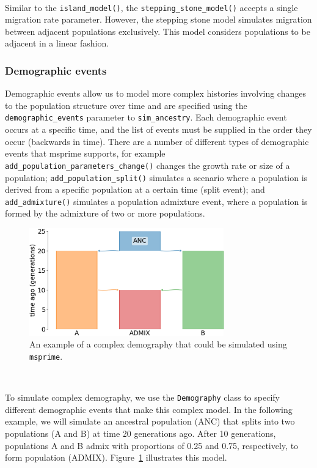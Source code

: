 \documentclass[graybox]{svmult}
\newcommand{\msprime}[0]{\texttt{msprime}}
\begin{document}
\label{stepping-stone-model} \

Similar to the \texttt{island\_model()}, the \texttt{stepping\_stone\_model()}
accepts a single migration rate parameter. However, the stepping stone model simulates
migration between adjacent populations exclusively. This model considers populations to be
adjacent in a linear fashion.

\subsubsection{Demographic events}\label{demographic-events}

Demographic events allow us to model more complex histories involving
changes to the population structure over time and are specified using
the \texttt{demographic\_events} parameter to \texttt{sim_ancestry}. Each
demographic event occurs at a specific time, and the list of events must
be supplied in the order they occur (backwards in time). There are a
number of different types of demographic events that msprime supports, for example
\texttt{add\_population\_parameters\_change()} changes the growth rate or size of a population;
\texttt{add\_population\_split()} simulates a scenario where a population is derived from a
specific population at a certain time (split event);
and \texttt{add\_admixture()} simulates a population admixture event, where a population is
formed by the admixture of two or more populations.

\begin{figure}[t]
\centering
\includegraphics[width=0.75\textwidth]{images/admixture.pdf}
\caption{\label{fig:complex-demography} An example of a complex demography that could be
simulated using \msprime.}
\end{figure}

\label{Complex-demography} \

To simulate complex demography, we use the \texttt{Demography} class to specify different
demographic events that make this complex model. In the following example, we will
simulate an ancestral population (ANC) that splits into two populations (A and B) at time
20 generations ago. After 10 generations, populations A and B admix with proportions of 0.25
and 0.75, respectively, to form population (ADMIX). Figure~\ref{fig:complex-demography}
illustrates this model.
\end{document}
